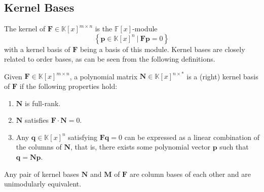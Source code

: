 \subsection{Kernel Bases}

The kernel of $\mathbf{F}\in\mathbb{K}\left[x\right]^{m\times n}$
is the $\mathbb{F}\left[x\right]$-module 
\[
\left\{ \mathbf{p}\in\mathbb{K}\left[x\right]^{n}~|~\mathbf{F}\mathbf{p}=0\right\} 
\]
with a kernel basis of $\mathbf{F}$ being a basis of this module.
Kernel bases are closely related to order bases, as can be seen from
the following definitions. 
\begin{defn}
\label{def:kernelBasis}Given $\mathbf{F}\in\mathbb{K}\left[x\right]^{m\times n}$,
a polynomial matrix $\mathbf{N}\in\mathbb{K}\left[x\right]^{n\times*}$
is a (right) kernel basis of $\mathbf{F}$ if the following properties
hold: 
\begin{enumerate}
\item $\mathbf{N}$ is full-rank. 
\item $\mathbf{N}$ satisfies $\mathbf{F}\cdot\mathbf{N}=0$. 
\item Any $\mathbf{q}\in\mathbb{K}\left[x\right]^{n}$ satisfying $\mathbf{F}\mathbf{q}=0$
can be expressed as a linear combination of the columns of $\mathbf{N}$,
that is, there exists some polynomial vector $\mathbf{p}$ such that
$\mathbf{q}=\mathbf{N}\mathbf{p}$. 
\end{enumerate}
\end{defn}
Any pair of kernel bases $\mathbf{N}$ and $\mathbf{M}$ of $\mathbf{F}$
are column bases of each other and are unimodularly equivalent.

